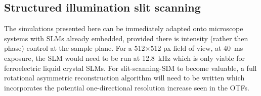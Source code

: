 \subsection{Structured illumination slit scanning}

The simulations presented here can be immediately adapted onto microscope systems with SLMs already embedded, provided there is intensity (rather then phase) control at the sample plane.
For a 512$\times$512 px field of view, at \SI{40}{\milli\second} exposure, the SLM would need to be run at \SI{12.8}{\kilo\hertz} which is only viable for ferroelectric liquid crystal SLMs.
For slit-scanning-SIM to become valuable, a full rotational asymmetric reconstruction algorithm will need to be written which incorporates the potential one-directional resolution increase seen in the OTFs.





